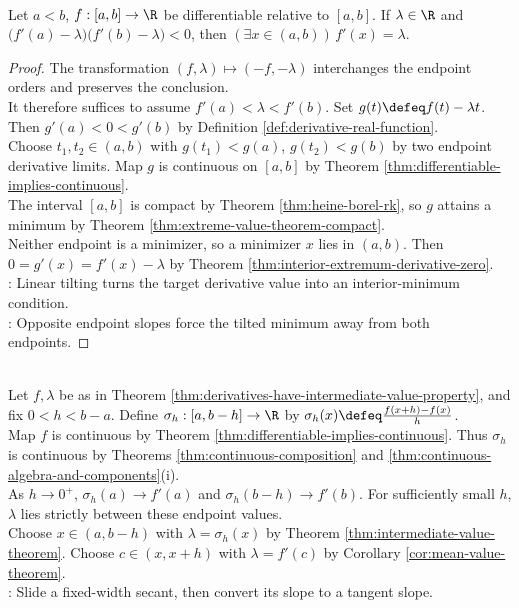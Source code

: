 \begin{theorem} \label{thm:derivatives-have-intermediate-value-property} \\
Let $a<b$, $f:[a,b]\to\R$ be differentiable relative to $[a,b]$. If $\lambda\in\R$ and $\bigl(f'(a)-\lambda\bigr)\bigl(f'(b)-\lambda\bigr)<0$, then $(\exists x\in(a,b))\,f'(x)=\lambda$.
\begin{proof}
The transformation $(f,\lambda)\mapsto(-f,-\lambda)$ interchanges the endpoint orders and preserves the conclusion.\\
It therefore suffices to assume $f'(a)<\lambda<f'(b)$. Set $g(t)\defeq f(t)-\lambda t$. Then $g'(a)<0<g'(b)$ by Definition \ref{def:derivative-real-function}.\\
Choose $t_1,t_2\in(a,b)$ with $g(t_1)<g(a)$, $g(t_2)<g(b)$ by two endpoint derivative limits. Map $g$ is continuous on $[a,b]$ by Theorem \ref{thm:differentiable-implies-continuous}.\\
The interval $[a,b]$ is compact by Theorem \ref{thm:heine-borel-rk}, so $g$ attains a minimum by Theorem \ref{thm:extreme-value-theorem-compact}.\\
Neither endpoint is a minimizer, so a minimizer $x$ lies in $(a,b)$. Then $0=g'(x)=f'(x)-\lambda$ by Theorem \ref{thm:interior-extremum-derivative-zero}.\\
: Linear tilting turns the target derivative value into an interior-minimum condition.\\
: Opposite endpoint slopes force the tilted minimum away from both endpoints.
\end{proof}
\end{theorem}

\begin{perspective} \label{per:sliding-secant-proof-of-darboux} \\
Let $f,\lambda$ be as in Theorem \ref{thm:derivatives-have-intermediate-value-property}, and fix $0<h<b-a$. Define $\sigma_h:[a,b-h]\to\R$ by $\sigma_h(x)\defeq\frac{f(x+h)-f(x)}{h}$.\\
Map $f$ is continuous by Theorem \ref{thm:differentiable-implies-continuous}. Thus $\sigma_h$ is continuous by Theorems \ref{thm:continuous-composition} and \ref{thm:continuous-algebra-and-components}(i).\\
As $h\to0^+$, $\sigma_h(a)\to f'(a)$ and $\sigma_h(b-h)\to f'(b)$. For sufficiently small $h$, $\lambda$ lies strictly between these endpoint values.\\
Choose $x\in(a,b-h)$ with $\lambda=\sigma_h(x)$ by Theorem \ref{thm:intermediate-value-theorem}. Choose $c\in(x,x+h)$ with $\lambda=f'(c)$ by Corollary \ref{cor:mean-value-theorem}.\\
: Slide a fixed-width secant, then convert its slope to a tangent slope.
\end{perspective}

